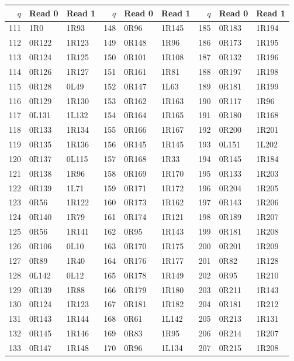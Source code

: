 \begin{center}
\begin{tabular}{rll@{\qquad}rll@{\qquad}rll}
\toprule
$q$ & Read 0 & Read 1 & $q$ & Read 0 & Read 1 & $q$ & Read 0 & Read 1\\
\midrule
111 & 1R0 & 1R93 & 148 & 0R96 & 1R145 & 185 & 0R183 & 1R194\\
112 & 0R122 & 1R123 & 149 & 0R148 & 1R96 & 186 & 0R173 & 1R195\\
113 & 0R124 & 1R125 & 150 & 0R101 & 1R108 & 187 & 0R132 & 1R196\\
114 & 0R126 & 1R127 & 151 & 0R161 & 1R81 & 188 & 0R197 & 1R198\\
115 & 0R128 & 0L49 & 152 & 0R147 & 1L63 & 189 & 0R181 & 1R199\\
116 & 0R129 & 1R130 & 153 & 0R162 & 1R163 & 190 & 0R117 & 1R96\\
117 & 0L131 & 1L132 & 154 & 0R164 & 1R165 & 191 & 0R180 & 1R168\\
118 & 0R133 & 1R134 & 155 & 0R166 & 1R167 & 192 & 0R200 & 1R201\\
119 & 0R135 & 1R136 & 156 & 0R145 & 1R145 & 193 & 0L151 & 1L202\\
120 & 0R137 & 0L115 & 157 & 0R168 & 1R33 & 194 & 0R145 & 1R184\\
121 & 0R138 & 1R96 & 158 & 0R169 & 1R170 & 195 & 0R133 & 1R203\\
122 & 0R139 & 1L71 & 159 & 0R171 & 1R172 & 196 & 0R204 & 1R205\\
123 & 0R56 & 1R122 & 160 & 0R173 & 1R162 & 197 & 0R143 & 1R206\\
124 & 0R140 & 1R79 & 161 & 0R174 & 1R121 & 198 & 0R189 & 1R207\\
125 & 0R56 & 1R141 & 162 & 0R95 & 1R143 & 199 & 0R181 & 1R208\\
126 & 0R106 & 0L10 & 163 & 0R170 & 1R175 & 200 & 0R201 & 1R209\\
127 & 0R89 & 1R40 & 164 & 0R176 & 1R177 & 201 & 0R82 & 1R128\\
128 & 0L142 & 0L12 & 165 & 0R178 & 1R149 & 202 & 0R95 & 1R210\\
129 & 0R139 & 1R88 & 166 & 0R179 & 1R180 & 203 & 0R211 & 1R143\\
130 & 0R124 & 1R123 & 167 & 0R181 & 1R182 & 204 & 0R181 & 1R212\\
131 & 0R143 & 1R144 & 168 & 0R61 & 1L142 & 205 & 0R213 & 1R131\\
132 & 0R145 & 1R146 & 169 & 0R83 & 1R95 & 206 & 0R214 & 1R207\\
133 & 0R147 & 1R148 & 170 & 0R96 & 1L134 & 207 & 0R215 & 1R208\\

\end{tabular}
\end{center}
